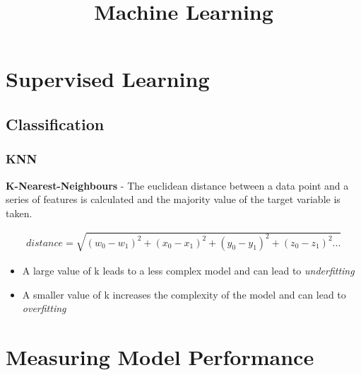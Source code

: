 {\Huge \title{Machine Learning}}
\section{Supervised Learning}
\subsection{Classification}
\subsubsection{KNN}
\textbf{K-Nearest-Neighbours} - The euclidean distance between a data point and a series of features is calculated and the majority value of the target variable is taken.

\begin{eqnarray*}
	\textit{distance} = \sqrt{(w_0-w_1)^2+(x_0-x_1)^2+(y_0 - y_1)^2+(z_0 - z_1)^2 ...}
\end{eqnarray*}

\begin{itemize}
	\item A large value of k leads to a less complex model and can lead to \textit{underfitting}
	\item A smaller value of k increases the complexity of the model and can lead to \textit{overfitting}
\end{itemize}

\section{Measuring Model Performance}
